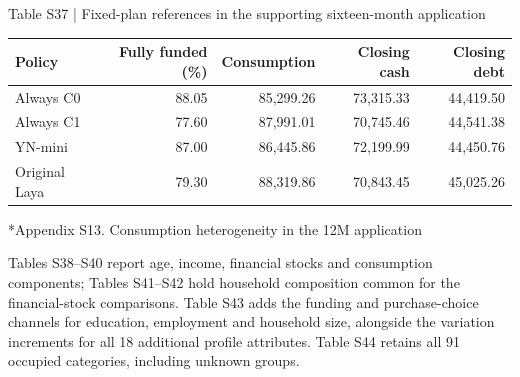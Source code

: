 \documentclass[10pt]{article}
\makeatletter
\renewcommand\section{\@startsection{section}{1}{\z@}{-2.2ex plus -1ex minus -.2ex}{.9ex plus .2ex}{\normalfont\large\mdseries}}
\makeatother
\begin{document}
\begin{center}\begin{minipage}{\textwidth}\fontsize{8.2}{10}\selectfont
Table S37 | Fixed-plan references in the supporting sixteen-month application
\par\vspace{4pt}
\begin{tabularx}{\textwidth}{@{}Xrrrr@{}}\toprule
Policy & Fully funded (\%) & Consumption & Closing cash & Closing debt \\
\midrule
Always C0 & 88.05 & 85,299.26 & 73,315.33 & 44,419.50 \\
Always C1 & 77.60 & 87,991.01 & 70,745.46 & 44,541.38 \\
YN-mini & 87.00 & 86,445.86 & 72,199.99 & 44,450.76 \\
Original Laya & 79.30 & 88,319.86 & 70,843.45 & 45,025.26 \\
\bottomrule\end{tabularx}
\par{}
\end{minipage}\end{center}

\section*{Appendix S13. Consumption heterogeneity in the 12M application}

Tables S38--S40 report age, income, financial stocks and consumption components; Tables S41--S42 hold household composition common for the financial-stock comparisons. Table S43 adds the funding and purchase-choice channels for education, employment and household size, alongside the variation increments for all 18 additional profile attributes. Table S44 retains all 91 occupied categories, including unknown groups.
\end{document}
